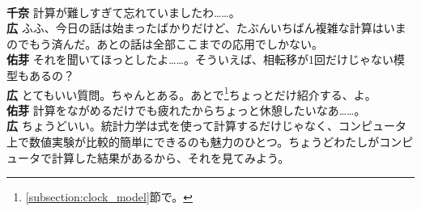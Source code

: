 \documentclass[paper=b5j,fontsize=12Q,jafontsize=12Q,baselineskip=21Q]{jlreq}
\DeclareRobustCommand{\hiron}{\textbf{広 }}
\DeclareRobustCommand{\chinan}{\textbf{千奈 }}
\DeclareRobustCommand{\umen}{\textbf{佑芽 }}
\begin{document}
\begin{refsection}
\\\chinan 計算が難しすぎて忘れていましたわ……。
\\\hiron ふふ、今日の話は始まったばかりだけど、たぶんいちばん複雑な計算はいまのでもう済んだ。あとの話は全部ここまでの応用でしかない。
\\\umen それを聞いてほっとしたよ……。そういえば、相転移が1回だけじゃない模型もあるの？
\\\hiron とてもいい質問。ちゃんとある。あとで\footnote{\ref{subsection:clock_model}節で。}ちょっとだけ紹介する、よ。
\\\umen 計算をながめるだけでも疲れたからちょっと休憩したいなあ……。
\\\hiron ちょうどいい。統計力学は式を使って計算するだけじゃなく、コンピュータ上で数値実験が比較的簡単にできるのも魅力のひとつ。ちょうどわたしがコンピュータで計算した結果があるから、それを見てみよう。


\end{refsection}
\end{document}
